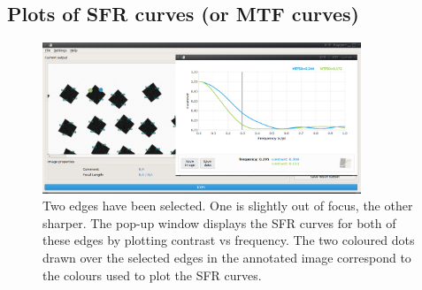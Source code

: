 \documentclass[a4paper]{article}
\begin{document}
\subsection{Plots of SFR curves (or MTF curves)}
\begin{figure}[!hb]
\centering
\includegraphics[width=0.85\textwidth]{figures/sfr_example}
\caption{Two edges have been selected. One is slightly out of focus, the other 
sharper. The pop-up window displays the SFR curves for both of these
edges by plotting contrast vs frequency. The two coloured dots drawn over
the selected edges in the annotated image correspond to the colours used 
to plot the SFR curves.}
\label{fig:sfr_example_repeat}
\end{figure}
\end{document}
